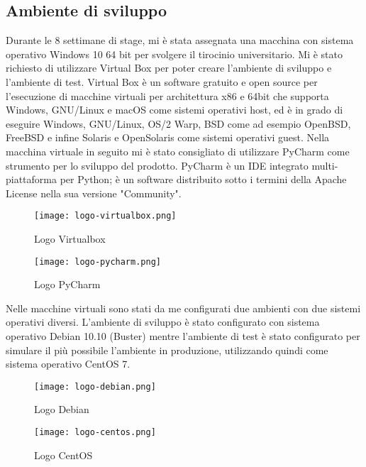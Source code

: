 \subsection{Ambiente di sviluppo}
Durante le 8 settimane di stage, mi è stata assegnata una macchina con sistema operativo Windows 10 64 bit per svolgere il tirocinio universitario. Mi è stato richiesto di utilizzare Virtual Box per poter creare l'ambiente di sviluppo e l'ambiente di test. \newline{} Virtual Box è un software gratuito e open source per l'esecuzione di macchine virtuali per architettura x86 e 64bit che supporta Windows, GNU/Linux e macOS come sistemi operativi host, ed è in grado di eseguire Windows, GNU/Linux, OS/2 Warp, BSD come ad esempio OpenBSD, FreeBSD e infine Solaris e OpenSolaris come sistemi operativi guest.\newline{}
Nella macchina virtuale in seguito mi è stato consigliato di utilizzare PyCharm come strumento per lo sviluppo del prodotto.\newline{}
PyCharm è un IDE integrato multi-piattaforma per Python; è un software distribuito sotto i termini della Apache License nella sua versione "Community".
\begin{figure}[!h]
    \begin{minipage}{.5\textwidth} 
        \centering 
        \texttt{[image: logo-virtualbox.png]} 
        \caption{Logo Virtualbox} 
        \label{fig:virtualbox} 
    \end{minipage}%
    \begin{minipage}{.5\textwidth} 
        \centering 
        \texttt{[image: logo-pycharm.png]} 
        \caption{Logo PyCharm} 
        \label{fig:pycharm} 
    \end{minipage}  
\end{figure}
\newpage{}
Nelle macchine virtuali sono stati da me configurati due ambienti con due sistemi operativi diversi. L'ambiente di sviluppo è stato configurato con sistema operativo Debian 10.10 (Buster) mentre l'ambiente di test è stato configurato per simulare il più possibile l'ambiente in produzione, utilizzando quindi come sistema operativo CentOS 7.
\begin{figure}[!h]
    \begin{minipage}{.5\textwidth} 
        \centering 
        \texttt{[image: logo-debian.png]} 
        \caption{Logo Debian} 
        \label{fig:virtualbox} 
    \end{minipage}%
    \begin{minipage}{.5\textwidth} 
        \centering 
        \texttt{[image: logo-centos.png]} 
        \caption{Logo CentOS} 
        \label{fig:pycharm} 
    \end{minipage}  
\end{figure}
